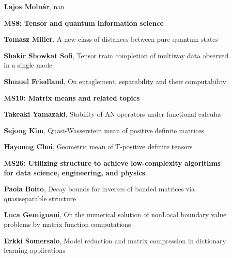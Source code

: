 \documentclass[ILAS2025-program.tex]{subfiles}
\begin{document}
\begin{description}
\begin{description}
        \item[] \textbf{Lajos Molnár}, nan
        \end{description}
    \begin{description}
    \item[] {\color{mstitle}\textbf{MS8: Tensor and quantum information science}} 
    \item[] \textbf{Tomasz Miller}, A new class of distances between pure quantum states
        \item[] \textbf{Shakir Showkat Sofi}, Tensor train completion of multiway data observed in a single mode
        \item[] \textbf{Shmuel Friedland}, On entaglement, separability and their computability
        \end{description}
    \begin{description}
    \item[] {\color{mstitle}\textbf{MS10: Matrix means and related topics}} 
    \item[] \textbf{Takeaki Yamazaki}, Stability of AN-operators under functional calculus
        \item[] \textbf{Sejong Kim}, Quasi-Wasserstein mean of positive definite matrices
        \item[] \textbf{Hayoung Choi}, Geometric mean of T-positive definite tensors
        \end{description}
    \begin{description}
    \item[] {\color{mstitle}\textbf{MS26: Utilizing structure to achieve low-complexity algorithms for data science, engineering, and physics}} 
    \item[] \textbf{Paola Boito}, Decay bounds for inverses of banded matrices via quasiseparable structure
        \item[] \textbf{Luca Gemignani}, On the numerical solution of nonLocal boundary value problems by matrix function computations
        \item[] \textbf{Erkki Somersalo}, Model reduction and matrix compression in dictionary learning applications
        \end{description}
    \begin{description}

\end{description}
\end{description}
\end{document}
